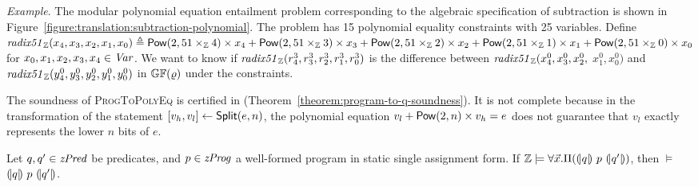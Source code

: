 \noindent
\emph{Example}.
The modular polynomial equation entailment problem corresponding to the
algebraic specification of subtraction is shown in
Figure~\ref{figure:translation:subtraction-polynomial}. The problem
has 15 polynomial equality constraints with 25 variables.
Define $\mathit{radix51}_{\mathbb{Z}}({x}_4, {x}_3, {x}_2, {x}_1, {x}_0) \triangleq \mbox{\textsf{Pow}}(2, 51 \times_{\mathbb{Z}} 4) \times {x}_4 + \mbox{\textsf{Pow}}(2, 51 \times_{\mathbb{Z}} 3) \times {x}_3 + \mbox{\textsf{Pow}}(2, 51 \times_{\mathbb{Z}} 2) \times {x}_2 + \mbox{\textsf{Pow}}(2, 51 \times_{\mathbb{Z}} 1) \times {x}_1 + \mbox{\textsf{Pow}}(2, 51 \times_{\mathbb{Z}} 0) \times {x}_0$ for ${x}_0, {x}_1, {x}_2, {x}_3, {x}_4 \in \mathit{Var}$.
We want to know if $\mathit{radix51}_{\mathbb{Z}}({r}^3_4, {r}^3_3, {r}^3_2,
{r}^3_1, {r}^3_0)$ is the difference between $\mathit{radix51}_{\mathbb{Z}}({x}^0_4,
{x}^0_3, {x}^0_2,$ ${x}^0_1, {x}^0_0)$ and $\mathit{radix51}_{\mathbb{Z}}({y}^0_4,
{y}^0_3, {y}^0_2, {y}^0_1, {y}^0_0)$ in $\mathbb{GF}(\varrho)$ under the
constraints.

The soundness of \textsc{ProgToPolyEq}
is certified in \coq (Theorem~\ref{theorem:program-to-q-soundness}).
It is not complete because in the transformation of the statement ${[}{v_h}, {v_l}{]} \leftarrow \mbox{\textsf{Split}}(e, n)$, the polynomial equation $v_l + \mbox{\textsf{Pow}}(2, n) \times v_h = e$ does not guarantee that $v_l$ exactly represents the lower $n$ bits of $e$.
\begin{theorem}
  \label{theorem:program-to-q-soundness}
  Let $q, q' \in \mathit{zPred}$ be predicates, and $p \in \mathit{zProg}$ a well-formed
  program in static single assignment form.
  If $\mathbb{Z} \models \forall \vec{x}.\Pi({(\!|}{q}{|\!)}~{p}~{(\!|}{q'}{|\!)})$, then
  $\models$ ${(\!|}{q}{|\!)}~{p}~{(\!|}{q'}{|\!)}$.
\end{theorem}
